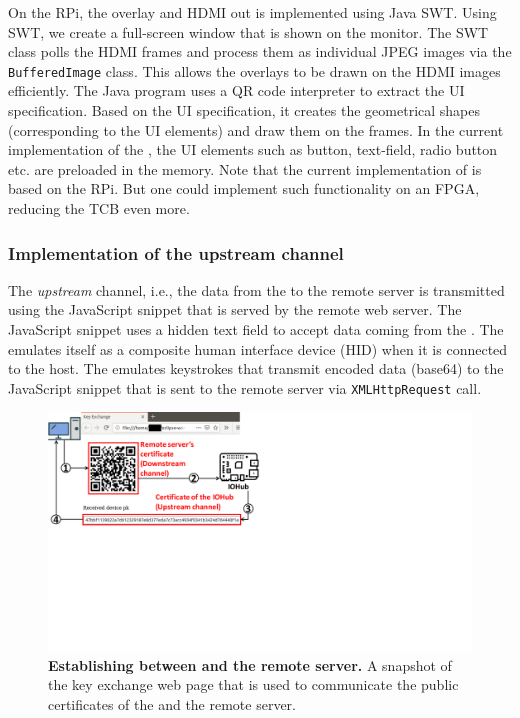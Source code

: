 On the RPi, the overlay and HDMI out is implemented using Java SWT. Using SWT, we create a full-screen window that is shown on the monitor. The SWT class polls the HDMI frames and process them as individual JPEG images via the \texttt{BufferedImage} class. This allows the overlays to be drawn on the HDMI images efficiently. The Java program uses a QR code interpreter to extract the UI specification. Based on the UI specification, it creates the geometrical shapes (corresponding to the UI elements) and draw them on the frames. In the current implementation of the \name, the UI elements such as button, text-field, radio button etc. are preloaded in the \device memory. Note that the current implementation of \device is based on the RPi. But one could implement such functionality on an FPGA, reducing the TCB even more. 




\subsubsection{Implementation of the upstream channel}
\label{sec:prototype:impl:upstream}
%
The \emph{upstream} channel, i.e., the data from the \device to the remote server is transmitted using the \name JavaScript snippet that is served by the remote web server. The \name JavaScript snippet uses a hidden text field to accept data coming from the \device. The \device emulates itself as a composite human interface device (HID) when it is connected to the host. The \device emulates keystrokes that transmit encoded data (base64) to the \name JavaScript snippet that is sent to the remote server via \texttt{XMLHttpRequest} call.

\begin{figure}[t]
\centering
\includegraphics[trim={0 10cm 17cm 0}, clip, width=0.8\linewidth]{chapters/ProtectIOn/images/keyExchange_1.pdf}
\caption[Establishing \tls between \device and the remote server]{\textbf{Establishing \tls between \device and the remote server.} A snapshot of the key exchange web page that is used to communicate the public certificates of the \device and the remote server.}
\label{fig:keyExchange}
\centering
\end{figure} 

